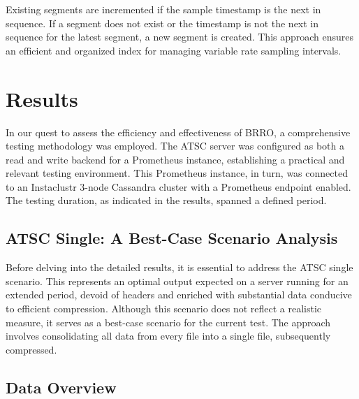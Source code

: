 \documentclass[conference]{IEEEtran}
\begin{document}
Existing segments are incremented if the sample timestamp is the next in sequence. If a segment does not exist or the timestamp is not the next in sequence for the latest segment, a new segment is created. This approach ensures an efficient and organized index for managing variable rate sampling intervals.







\section{Results}

In our quest to assess the efficiency and effectiveness of BRRO, a comprehensive testing methodology was employed. The ATSC server was configured as both a read and write backend for a Prometheus instance, establishing a practical and relevant testing environment. This Prometheus instance, in turn, was connected to an Instaclustr 3-node Cassandra cluster with a Prometheus endpoint enabled. The testing duration, as indicated in the results, spanned a defined period.

\subsection*{ATSC Single: A Best-Case Scenario Analysis}

Before delving into the detailed results, it is essential to address the ATSC single scenario. This represents an optimal output expected on a server running for an extended period, devoid of headers and enriched with substantial data conducive to efficient compression. Although this scenario does not reflect a realistic measure, it serves as a best-case scenario for the current test. The approach involves consolidating all data from every file into a single file, subsequently compressed.

\subsection*{Data Overview}
\end{document}
